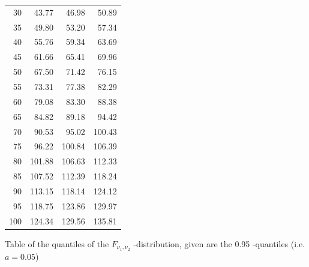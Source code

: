 \documentclass{article}
\begin{document}
\begin{minipage}[t]{6cm}
\begin{center}
\begin{tabular}{|r|rrr|}
				30 & 43.77 & 46.98 & 50.89 \\
				35 & 49.80 & 53.20 & 57.34 \\
				40 & 55.76 & 59.34 & 63.69 \\
				45 & 61.66 & 65.41 & 69.96 \\
				50 & 67.50 & 71.42 & 76.15 \\
				55 & 73.31 & 77.38 & 82.29 \\
				60 & 79.08 & 83.30 & 88.38 \\
				65 & 84.82 & 89.18 & 94.42 \\
				70 & 90.53 & 95.02 & 100.43 \\
				75 & 96.22 & 100.84 & 106.39 \\
				80 & 101.88 & 106.63 & 112.33 \\
				85 & 107.52 & 112.39 & 118.24 \\
				90 & 113.15 & 118.14 & 124.12 \\
				95 & 118.75 & 123.86 & 129.97 \\
				100 & 124.34 & 129.56 & 135.81 \\ \hline
			\end{tabular}
		\end{center}
	\end{minipage}\newpage Table of the quantiles of the $F_{\nu _{1},\nu _{2}}$%
	-distribution,	given are the 0.95 -quantiles (i.e. $a=0.05$)
	
\end{document}
